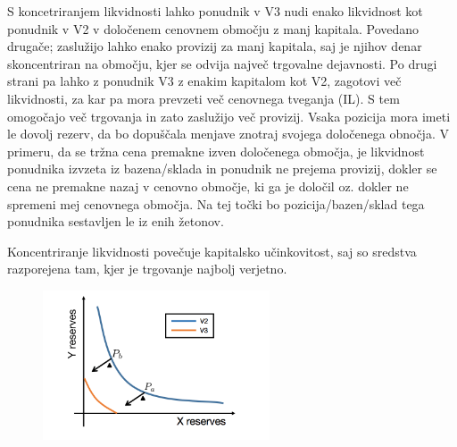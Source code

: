 \documentclass[a4paper,12pt]{article}%
\begin{document}
S koncetriranjem likvidnosti lahko ponudnik v V3 nudi enako likvidnost kot ponudnik v V2 v določenem cenovnem območju z manj kapitala. Povedano drugače; zaslužijo lahko enako provizij za manj kapitala, saj je njihov denar skoncentriran na območju, kjer se odvija največ trgovalne dejavnosti. Po drugi strani pa lahko z ponudnik V3 z enakim kapitalom kot V2, zagotovi več likvidnosti, za kar pa mora prevzeti več cenovnega tveganja (IL). S tem omogočajo več trgovanja in zato zaslužijo več provizij. 
Vsaka pozicija mora imeti le dovolj rezerv, da bo dopuščala menjave znotraj svojega določenega obnočja. %
V primeru, da se tržna cena premakne izven določenega območja, je likvidnost ponudnika izvzeta iz bazena/sklada in ponudnik ne prejema provizij, dokler se cena ne premakne nazaj v cenovno območje, ki ga je določil oz. dokler ne spremeni mej cenovnega območja. Na tej točki bo pozicija/bazen/sklad tega ponudnika sestavljen le iz enih žetonov. 



Koncentriranje likvidnosti povečuje kapitalsko učinkovitost, saj so sredstva razporejena tam, kjer je trgovanje najbolj verjetno.

\begin{figure}[!ht]
    \centering
    \includegraphics[width=0.6\textwidth]{krivulja.png}
\end{figure}
\end{document}
